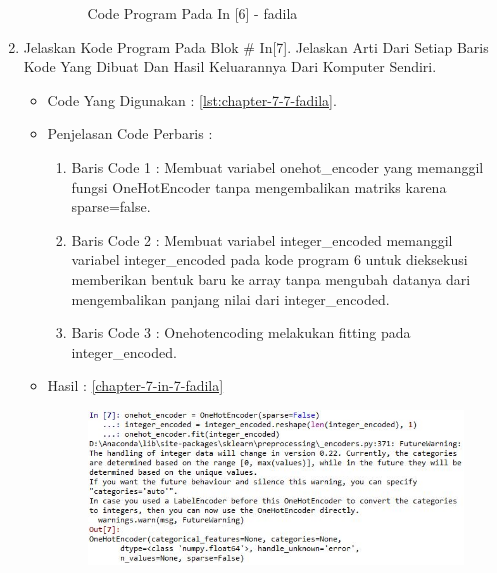 \begin{enumerate}
\begin{itemize}
\begin{figure}[!hbtp]
\caption{Code Program Pada In [6] - fadila}
\label{chapter-7-in-6-fadila}
\end{figure}
\par
\par
\end{itemize}
\par
\par
\par
\item Jelaskan Kode Program Pada Blok \# In[7]. Jelaskan Arti Dari Setiap Baris Kode Yang Dibuat Dan Hasil Keluarannya Dari Komputer Sendiri.
\begin{itemize}
\item Code Yang Digunakan : \ref{lst:chapter-7-7-fadila}.

\par
\par
\item Penjelasan Code Perbaris	: 
\begin{enumerate}
\item Baris Code 1	: Membuat variabel onehot\_encoder yang memanggil fungsi OneHotEncoder tanpa mengembalikan matriks karena sparse=false.
\item Baris Code 2	: Membuat variabel integer\_encoded memanggil variabel integer\_encoded pada kode program 6 untuk dieksekusi memberikan bentuk baru ke array tanpa mengubah datanya dari mengembalikan panjang nilai dari integer\_encoded.
\item Baris Code 3	: Onehotencoding melakukan fitting pada integer\_encoded.
\end{enumerate}
\item Hasil : \ref{chapter-7-in-7-fadila}
\par
\par
\begin{figure}[!hbtp]
\centering
\includegraphics[scale=0.4]{figures/chapter-7-in-7-fadila.jpg}

\end{figure}
\end{itemize}
\end{enumerate}
